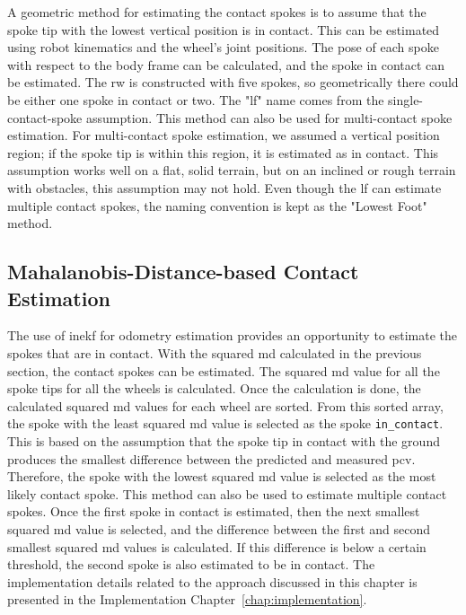 \documentclass[report.tex]{subfiles}
\begin{document}
        A geometric method for estimating the contact spokes is to assume that the spoke tip with the lowest vertical position is in contact. This can be estimated using robot kinematics and the wheel's joint positions. The pose of each spoke with respect to the body frame can be calculated, and the spoke in contact can be estimated. The \gls{rw} is constructed with five spokes, so geometrically there could be either one spoke in contact or two. The "\gls{lf}" name comes from the single-contact-spoke assumption. This method can also be used for multi-contact spoke estimation. For multi-contact spoke estimation, we assumed a vertical position region; if the spoke tip is within this region, it is estimated as in contact. This assumption works well on a flat, solid terrain, but on an inclined or rough terrain with obstacles, this assumption may not hold. Even though the \gls{lf} can estimate multiple contact spokes, the naming convention is kept as the "Lowest Foot" method.
              
        \subsection{Mahalanobis-Distance-based Contact Estimation} \label{subsec:mahala-based-contact-estimation}
        
        The use of \gls{inekf} for odometry estimation provides an opportunity to estimate the spokes that are in contact. With the squared \gls{md} calculated in the previous section, the contact spokes can be estimated. The squared \gls{md} value for all the spoke tips for all the wheels is calculated. Once the calculation is done, the calculated squared \gls{md} values for each wheel are sorted. From this sorted array, the spoke with the least squared \gls{md} value is selected as the spoke \texttt{in\_contact}. This is based on the assumption that the spoke tip in contact with the ground produces the smallest difference between the predicted and measured \gls{pcv}. Therefore, the spoke with the lowest squared \gls{md} value is selected as the most likely contact spoke. This method can also be used to estimate multiple contact spokes. Once the first spoke in contact is estimated, then the next smallest squared \gls{md} value is selected, and the difference between the first and second smallest squared \gls{md} values is calculated. If this difference is below a certain threshold, the second spoke is also estimated to be in contact. The implementation details related to the approach discussed in this chapter is presented in the Implementation Chapter~\ref{chap:implementation}.
        
\end{document}
